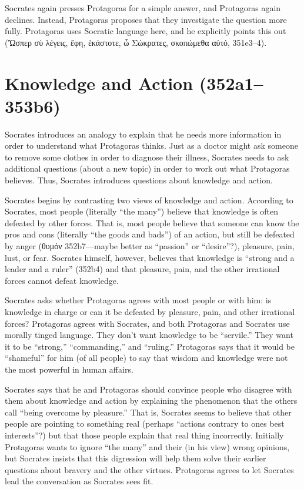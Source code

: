 \documentclass[12pt,letterpaper]{article}
\begin{document}
Socrates again presses Protagoras for a simple answer, and Protagoras again declines.
Instead, Protagoras proposes that they investigate the question more fully.
Protagoras uses Socratic language here, and he explicitly points this out (\textgreek{Ὥσπερ σὺ λέγεις, ἔφη, ἑκάστοτε, ὦ Σώκρατες, σκοπώμεθα αὐτό}, 351e3--4).

\section*{Knowledge and Action (352a1--353b6)}

Socrates introduces an analogy to explain that he needs more information in order to understand what Protagoras thinks.
Just as a doctor might ask someone to remove some clothes in order to diagnose their illness, Socrates needs to ask additional questions (about a new topic) in order to work out what Protagoras believes.
Thus, Socrates introduces questions about knowledge and action.

Socrates begins by contrasting two views of knowledge and action.
According to Socrates, most people (literally ``the many'') believe that knowledge is often defeated by other forces.
That is, most people believe that someone can know the pros and cons (literally ``the goods and bads'') of an action, but still be defeated by anger (\textgreek{θυμόν} 352b7---maybe better as ``passion'' or ``desire''?), pleasure, pain, lust, or fear.
Socrates himself, however, believes that knowledge is ``strong and a leader and a ruler'' (352b4) and that pleasure, pain, and the other irrational forces cannot defeat knowledge.

Socrates asks whether Protagoras agrees with most people or with him: is knowledge in charge or can it be defeated by pleasure, pain, and other irrational forces?
Protagoras agrees with Socrates, and both Protagoras and Socrates use morally tinged language.
They don't want knowledge to be ``servile.''
They want it to be ``strong,'' ``commanding,'' and ``ruling.''
Protagoras says that it would be ``shameful'' for him (of all people) to say that wisdom and knowledge were not the most powerful in human affairs.

Socrates says that he and Protagoras should convince people who disagree with them about knowledge and action by explaining the phenomenon that the others call ``being overcome by pleasure.''
That is, Socrates seems to believe that other people are pointing to something real (perhaps ``actions contrary to ones best interests''?) but that those people explain that real thing incorrectly.
Initially Protagoras wants to ignore ``the many'' and their (in his view) wrong opinions, but Socrates insists that this digression will help them solve their earlier questions about bravery and the other virtues.
Protagoras agrees to let Socrates lead the conversation as Socrates sees fit.
\end{document}
